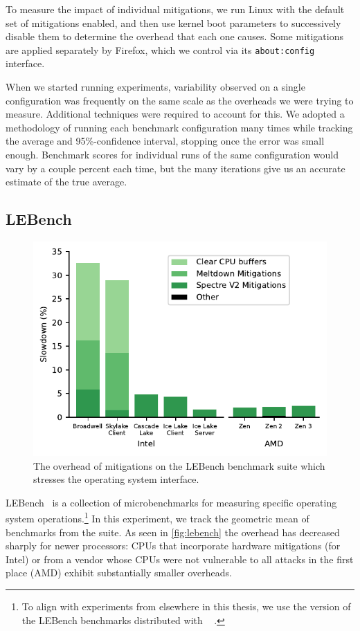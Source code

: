 To measure the impact of individual mitigations, we run  Linux with the default set of mitigations enabled, and then use kernel boot parameters to successively disable them to determine the overhead that each one causes.
Some mitigations are applied separately by Firefox, which we control via its \texttt{about:config} interface.

When we started running experiments, variability observed on a single configuration was frequently on the same scale as the overheads we were trying to measure.
Additional techniques were required to account for this.
We adopted a methodology of running each benchmark configuration many times while tracking the average and 95\%-confidence interval, stopping once the error was small enough.
Benchmark scores for individual runs of the same configuration would vary by a couple percent each time, but the many iterations give us an accurate estimate of the true average.

\subsection{LEBench}
\label{sec:benchmarks:lebench}

\begin{figure}[t]
    \includegraphics[width=\columnwidth]{plots/lebench.pdf}
    \caption{The overhead of mitigations on the LEBench benchmark suite which stresses the operating system interface.}
    \label{fig:lebench}
\end{figure}


LEBench~\cite{ren:lebench} is a collection of microbenchmarks for measuring specific operating system operations.\footnote{To align with experiments from elsewhere in this thesis, we use the version of the LEBench benchmarks distributed with \sys~\cite{behrens:ward} .}
In this experiment, we track the geometric mean of benchmarks from the suite.
As seen in \autoref{fig:lebench} the overhead has decreased sharply for newer processors:
CPUs that incorporate hardware mitigations (for Intel) or from a vendor whose CPUs were not vulnerable to all attacks in the first place (AMD) exhibit substantially smaller overheads.

